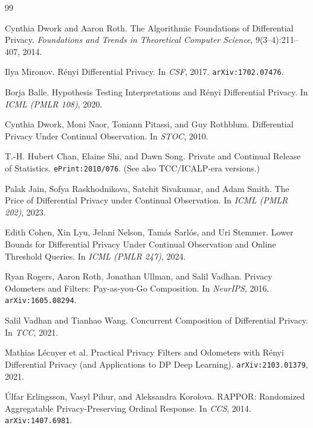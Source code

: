 \documentclass[11pt]{article}
\begin{document}
\begin{thebibliography}{99}\small

Cynthia Dwork and Aaron Roth.
\newblock The Algorithmic Foundations of Differential Privacy.
\newblock \emph{Foundations and Trends in Theoretical Computer Science}, 9(3--4):211--407, 2014.

Ilya Mironov.
\newblock Rényi Differential Privacy.
\newblock In \emph{CSF}, 2017.\; \texttt{arXiv:1702.07476}.

Borja Balle.
\newblock Hypothesis Testing Interpretations and Rényi Differential Privacy.
\newblock In \emph{ICML (PMLR 108)}, 2020.

Cynthia Dwork, Moni Naor, Toniann Pitassi, and Guy Rothblum.
\newblock Differential Privacy Under Continual Observation.
\newblock In \emph{STOC}, 2010.

T.-H. Hubert Chan, Elaine Shi, and Dawn Song.
\newblock Private and Continual Release of Statistics.
\newblock \texttt{ePrint:2010/076}. (See also TCC/ICALP-era versions.)

Palak Jain, Sofya Raskhodnikova, Satchit Sivakumar, and Adam Smith.
\newblock The Price of Differential Privacy under Continual Observation.
\newblock In \emph{ICML (PMLR 202)}, 2023.

Edith Cohen, Xin Lyu, Jelani Nelson, Tamás Sarlós, and Uri Stemmer.
\newblock Lower Bounds for Differential Privacy Under Continual Observation and Online Threshold Queries.
\newblock In \emph{ICML (PMLR 247)}, 2024.

Ryan Rogers, Aaron Roth, Jonathan Ullman, and Salil Vadhan.
\newblock Privacy Odometers and Filters: Pay-as-you-Go Composition.
\newblock In \emph{NeurIPS}, 2016.\; \texttt{arXiv:1605.08294}.

Salil Vadhan and Tianhao Wang.
\newblock Concurrent Composition of Differential Privacy.
\newblock In \emph{TCC}, 2021.

Mathias Lécuyer et al.
\newblock Practical Privacy Filters and Odometers with Rényi Differential Privacy (and Applications to DP Deep Learning).
\newblock \texttt{arXiv:2103.01379}, 2021.

Úlfar Erlingsson, Vasyl Pihur, and Aleksandra Korolova.
\newblock RAPPOR: Randomized Aggregatable Privacy-Preserving Ordinal Response.
\newblock In \emph{CCS}, 2014.\; \texttt{arXiv:1407.6981}.


\end{thebibliography}
\end{document}
